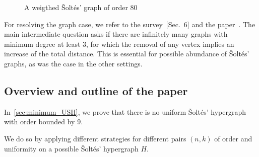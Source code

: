 \documentclass[a4paper,11pt]{article}
\begin{document}
\begin{figure}[h]
    \centering
    \caption{A weigthed \v Solt\'es' graph of order $80$}
    \label{fig:SoltesWG}
\end{figure}

For resolving the graph case, we refer to the survey~[Sec.~6]\cite{KST23} and the paper~\cite{Cambie24}. The main intermediate question asks if there are infinitely many graphs with minimum degree at least $3$, for which the removal of any vertex implies an increase of the total distance. This is essential for possible abundance of \v Solt\'es' graphs, as was the case in the other settings.

\newpage
\subsection*{Overview and outline of the paper}

In~\cref{sec:minimum_USH}, we prove that there is no uniform \v Solt\'es' hypergraph with order bounded by $9.$

We do so by applying different strategies for different pairs $(n,k)$ of order and uniformity on a possible \v Solt\'es' hypergraph $H$.
\end{document}
